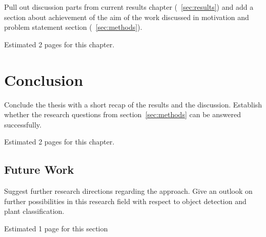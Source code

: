 \documentclass[draft,final]{vutinfth} %
\begin{document}
Pull out discussion parts from current results chapter
(~\ref{sec:results}) and add a section about achievement of the aim
of the work discussed in motivation and problem statement section
(~\ref{sec:methods}).

Estimated 2 pages for this chapter.

\chapter{Conclusion}
\label{chap:conclusion}

Conclude the thesis with a short recap of the results and the
discussion. Establish whether the research questions from
section~\ref{sec:methods} can be answered successfully.

Estimated 2 pages for this chapter.

\section{Future Work}
\label{sec:future-work}

Suggest further research directions regarding the approach. Give an
outlook on further possibilities in this research field with respect
to object detection and plant classification.

Estimated 1 page for this section

\backmatter

\listoffigures %

\cleardoublepage %
\listoftables %

\listofalgorithms
{}

\printindex

\printglossaries

%
\printbibliography
\end{document}
